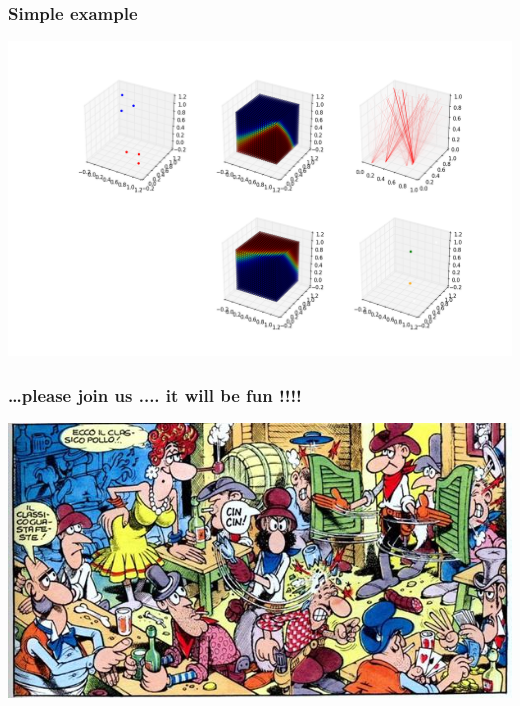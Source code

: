 \documentclass[xcolor=pdftex,dvipsnames,table]{beamer}
\begin{document}
\begin{frame}
  \frametitle{Simple example}
  \begin{center}
    \includegraphics[width=\textwidth]{KebAB.png}
  \end{center}
\end{frame}
\begin{frame}
  \frametitle{\dots please join us .... it will be fun !!!!}
  \begin{center}
    \includegraphics[width=\textwidth]{welcome.jpg}
  \end{center}
\end{frame}

\begin{frame}
  
\end{frame}
\end{document}

